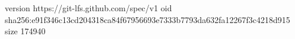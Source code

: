 version https://git-lfs.github.com/spec/v1
oid sha256:e91f346c13cd204318ca84f67956693e7333b7793da632fa12267f3c4218d915
size 174940
